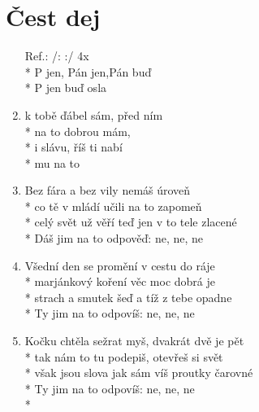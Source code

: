 \section{Čest dej}
\begin{enumerate}
\item[Ref.:] /:  :/                      4x \\*
  P jen, Pán jen,Pán buď  \\*             %
P jen  buď osla 
\item {} k tobě ďábel sám,  před ním  \\*
na to dobrou  mám,   \\*
 i slávu,  říš  ti nabí \\*
 mu na to     
\item Bez fára a bez vily nemáš úroveň \\*
co tě v mládí učili na to zapomeň \\*
celý svět už věří teď jen v to tele zlacené \\*
Dáš jim na to odpověď: ne, ne, ne 
\item Všední den se promění v cestu do ráje \\*
marjánkový koření věc moc dobrá je \\*
strach a smutek šeď a tíž z tebe opadne \\*
Ty jim na to odpovíš: ne, ne, ne 
\item Kočku chtěla sežrat myš, dvakrát dvě je pět \\*
tak nám to tu podepiš, otevřeš si svět \\*
však jsou slova jak sám víš proutky čarovné \\*
Ty jim na to odpovíš: ne, ne, ne \\*
\end{enumerate}
